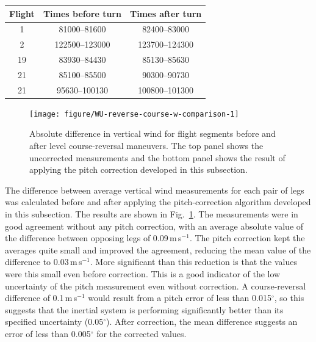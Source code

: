 \documentclass[12pt,twoside,english]{article}\usepackage[]{graphicx}\usepackage[]{color}
\newenvironment{knitrout}{}{} %
\providecommand{\tabularnewline}{\\}
\begin{document}
\begin{minipage}[t]{1\columnwidth}%
\hskip1in%
\begin{tabular}{|c|c|c|}
\hline 
\textbf{Flight}  &
\textbf{Times before turn}  &
\textbf{Times after turn}\tabularnewline
\hline 
\hline 
1  &
81000--81600  &
82400--83000\tabularnewline
\hline 
2  &
122500--123000  &
123700--124300\tabularnewline
\hline 
19  &
83930--84430  &
85130--85630\tabularnewline
\hline 
21  &
85100--85500  &
90300--90730\tabularnewline
\hline 
21  &
95630--100130  &
100800--101300\tabularnewline
\hline 
\end{tabular}%
\end{minipage}




\begin{knitrout}\footnotesize
{}\color{fgcolor}\begin{figure}

{\centering \texttt{[image: figure/WU-reverse-course-w-comparison-1]} 

}

\caption[Absolute difference in vertical wind for flight segments before and after level course-reversal maneuvers]{Absolute difference in vertical wind for flight segments before and after level course-reversal maneuvers. The top panel shows the uncorrected measurements and the bottom panel shows the result of applying the pitch correction developed in this subsection.}\label{fig:reverse-course-w-comparison}
\end{figure}


\end{knitrout}

The difference between average vertical wind measurements for each  pair of legs was calculated before and after applying the pitch-correction  algorithm developed in this subsection. The results are shown in Fig.~\ref{fig:reverse-course-w-comparison}. The measurements were in good agreement without any pitch correction, with an average absolute value of the difference between opposing legs of 0.09\,m\,s$^{-1}$. The pitch correction kept the averages quite small and improved the agreement, reducing the mean value of the difference to 0.03\,m\,s$^{-1}$. More significant than this reduction is that the values were this small even before correction. This is a good indicator of the low uncertainty of the pitch measurement even without correction. A course-reversal difference of 0.1\,m\,s$^{-1}$ would result from a pitch error  of less than 0.015$^{\circ}$, so this suggests that the inertial system is performing significantly better than its specified uncertainty (0.05$^{\circ}$). After correction, the mean difference suggests an error of less than 0.005$^{\circ}$ for the corrected values. 
\end{document}
